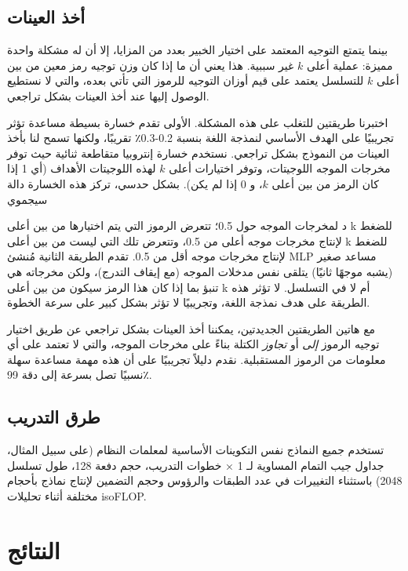 \documentclass[11pt, a4paper, onecolumn, logo, copyright]{googledeepmind}
\begin{document}
\subsection{أخذ العينات}
\label{sec:sampling}
بينما يتمتع التوجيه المعتمد على اختيار الخبير بعدد من المزايا، إلا أن له مشكلة واحدة مميزة: عملية أعلى $k$ غير سببية. هذا يعني أن ما إذا كان وزن توجيه رمز معين من بين أعلى $k$ للتسلسل يعتمد على قيم أوزان التوجيه للرموز التي تأتي بعده، والتي لا نستطيع الوصول إليها عند أخذ العينات بشكل تراجعي.

اختبرنا طريقتين للتغلب على هذه المشكلة. الأولى تقدم خسارة بسيطة مساعدة تؤثر تجريبيًا على الهدف الأساسي لنمذجة اللغة بنسبة 0.2-0.3٪ تقريبًا، ولكنها تسمح لنا بأخذ العينات من النموذج بشكل تراجعي. نستخدم خسارة إنتروبيا متقاطعة ثنائية حيث توفر مخرجات الموجه اللوجيتات، وتوفر اختيارات أعلى $k$ لهذه اللوجيتات الأهداف (أي 1 إذا كان الرمز من بين أعلى $k$، و 0 إذا لم يكن). بشكل حدسي، تركز هذه الخسارة دالة سيجموي

د لمخرجات الموجه حول 0.5؛ تتعرض الرموز التي يتم اختيارها من بين أعلى k للضغط لإنتاج مخرجات موجه أعلى من 0.5، وتتعرض تلك التي ليست من بين أعلى k للضغط لإنتاج مخرجات موجه أقل من 0.5. تقدم الطريقة الثانية مُنشئ MLP مساعد صغير (يشبه موجهًا ثانيًا) يتلقى نفس مدخلات الموجه (مع إيقاف التدرج)، ولكن مخرجاته هي تنبؤ بما إذا كان هذا الرمز سيكون من بين أعلى k أم لا في التسلسل. لا تؤثر هذه الطريقة على هدف نمذجة اللغة، وتجريبيًا لا تؤثر بشكل كبير على سرعة الخطوة.

مع هاتين الطريقتين الجديدتين، يمكننا أخذ العينات بشكل تراجعي عن طريق اختيار توجيه الرموز \textit{إلى} أو \textit{تجاوز} الكتلة بناءً على مخرجات الموجه، والتي لا تعتمد على أي معلومات من الرموز المستقبلية. نقدم دليلاً تجريبيًا على أن هذه مهمة مساعدة سهلة نسبيًا تصل بسرعة إلى دقة 99٪.

\subsection{طرق التدريب}
تستخدم جميع النماذج نفس التكوينات الأساسية لمعلمات النظام (على سبيل المثال، جداول جيب التمام المساوية لـ 1 × خطوات التدريب، حجم دفعة 128، طول تسلسل 2048) باستثناء التغييرات في عدد الطبقات والرؤوس وحجم التضمين لإنتاج نماذج بأحجام مختلفة أثناء تحليلات isoFLOP.

\section{النتائج}
\end{document}
